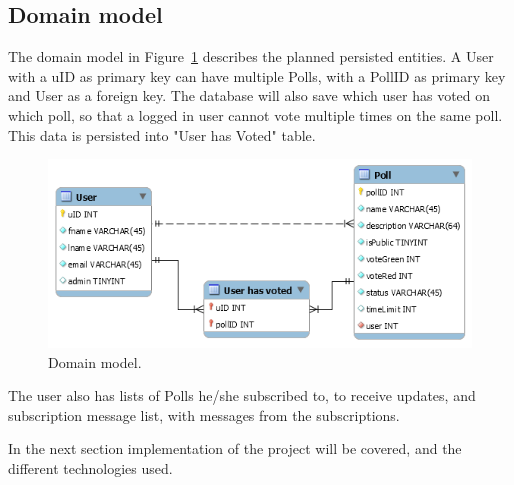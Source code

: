 \subsection{Domain model}
\label{sub:domainmodel}
The domain model in Figure~\ref{fig:domainmodel} describes the planned persisted entities. A User with a uID as primary key can have multiple Polls, with a PollID as primary key and User as a foreign key. The database will also save which user has voted on which poll, so that a logged in user cannot vote multiple times on the same poll. This data is persisted into "User has Voted" table.
\begin{figure}[H]
  \centering
  \includegraphics[scale=0.5]{figs/domainmodel.png}
  \caption[scale=0.5]{Domain model.}
  \label{fig:domainmodel}
\end{figure}

The user also has lists of Polls he/she subscribed to, to receive updates, and subscription message list, with messages from the subscriptions.

\par\noindent In the next section implementation of the project will be covered, and the different technologies used.